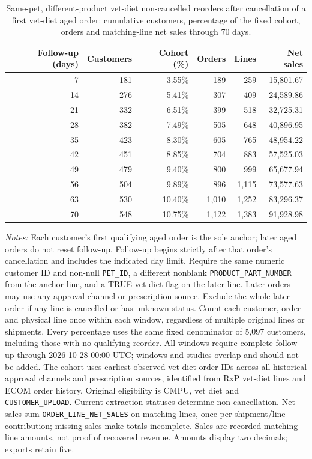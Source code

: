 \begin{table}[!htbp]
\centering
\caption{Same-pet, different-product vet-diet non-cancelled reorders after cancellation of a first vet-diet aged order: cumulative customers, percentage of the fixed cohort, orders and matching-line net sales through 70 days.}
\label{tab:financial-opportunity-new-vet-diet-same-pet-different-part}
\begin{tabular}{@{}rrrrrr@{}}
\toprule
Follow-up (days) & Customers & Cohort (\%) & Orders & Lines & Net sales \\
\midrule
7 & 181 & 3.55\% & 189 & 259 & 15,801.67 \\
14 & 276 & 5.41\% & 307 & 409 & 24,589.86 \\
21 & 332 & 6.51\% & 399 & 518 & 32,725.31 \\
28 & 382 & 7.49\% & 505 & 648 & 40,896.95 \\
35 & 423 & 8.30\% & 605 & 765 & 48,954.22 \\
42 & 451 & 8.85\% & 704 & 883 & 57,525.03 \\
49 & 479 & 9.40\% & 800 & 999 & 65,677.94 \\
56 & 504 & 9.89\% & 896 & 1,115 & 73,577.63 \\
63 & 530 & 10.40\% & 1,010 & 1,252 & 83,296.37 \\
70 & 548 & 10.75\% & 1,122 & 1,383 & 91,928.98 \\
\bottomrule
\end{tabular}

\begin{minipage}{\linewidth}
\footnotesize
\textit{Notes:} Each customer's first qualifying aged order is the sole anchor;
later aged orders do not reset follow-up. Follow-up begins strictly after that
order's cancellation and includes the indicated day limit. Require the same numeric customer ID and non-null \texttt{PET\_ID}, a different nonblank \texttt{PRODUCT\_PART\_NUMBER} from the anchor line, and a TRUE vet-diet flag on the later line. Later orders may use any approval channel or prescription
source. Exclude the whole later order if any line is cancelled or has unknown
status. Count each customer, order and physical line once within each window,
regardless of multiple original lines or shipments. Every percentage uses the
same fixed denominator of 5,097 customers, including those with no
qualifying reorder. All windows require complete follow-up through
2026-10-28 00:00 UTC; windows and studies overlap and should not be added.
The cohort uses earliest observed vet-diet order IDs across all historical approval channels and prescription sources, identified from RxP vet-diet lines and ECOM order history. Original eligibility is CMPU,
vet diet and \texttt{CUSTOMER\_UPLOAD}. Current extraction statuses determine
non-cancellation. Net sales sum \texttt{ORDER\_LINE\_NET\_SALES} on matching
lines, once per shipment/line contribution; missing sales make totals incomplete.
Sales are recorded matching-line amounts, not proof of recovered revenue.
Amounts display two decimals; exports retain five.
\end{minipage}
\end{table}

